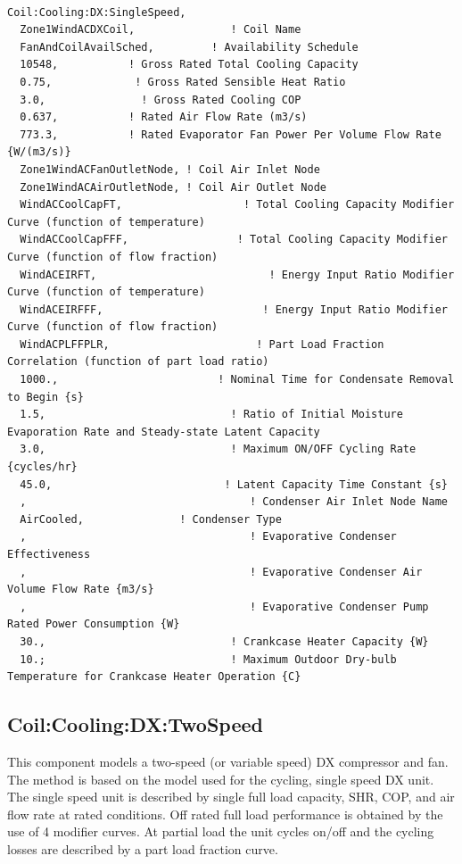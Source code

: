 \begin{lstlisting}

Coil:Cooling:DX:SingleSpeed,
  Zone1WindACDXCoil,               ! Coil Name
  FanAndCoilAvailSched,         ! Availability Schedule
  10548,           ! Gross Rated Total Cooling Capacity
  0.75,             ! Gross Rated Sensible Heat Ratio
  3.0,               ! Gross Rated Cooling COP
  0.637,           ! Rated Air Flow Rate (m3/s)
  773.3,           ! Rated Evaporator Fan Power Per Volume Flow Rate {W/(m3/s)}
  Zone1WindACFanOutletNode, ! Coil Air Inlet Node
  Zone1WindACAirOutletNode, ! Coil Air Outlet Node
  WindACCoolCapFT,                   ! Total Cooling Capacity Modifier Curve (function of temperature)
  WindACCoolCapFFF,                 ! Total Cooling Capacity Modifier Curve (function of flow fraction)
  WindACEIRFT,                           ! Energy Input Ratio Modifier Curve (function of temperature)
  WindACEIRFFF,                         ! Energy Input Ratio Modifier Curve (function of flow fraction)
  WindACPLFFPLR,                       ! Part Load Fraction Correlation (function of part load ratio)
  1000.,                         ! Nominal Time for Condensate Removal to Begin {s}
  1.5,                             ! Ratio of Initial Moisture Evaporation Rate and Steady-state Latent Capacity
  3.0,                             ! Maximum ON/OFF Cycling Rate {cycles/hr}
  45.0,                           ! Latent Capacity Time Constant {s}
  ,                                   ! Condenser Air Inlet Node Name
  AirCooled,               ! Condenser Type
  ,                                   ! Evaporative Condenser Effectiveness
  ,                                   ! Evaporative Condenser Air Volume Flow Rate {m3/s}
  ,                                   ! Evaporative Condenser Pump Rated Power Consumption {W}
  30.,                             ! Crankcase Heater Capacity {W}
  10.;                             ! Maximum Outdoor Dry-bulb Temperature for Crankcase Heater Operation {C}
\end{lstlisting}

\subsection{Coil:Cooling:DX:TwoSpeed}\label{coilcoolingdxtwospeed}

This component models a two-speed (or variable speed) DX compressor and fan. The method is based on the model used for the cycling, single speed DX unit. The single speed unit is described by single full load capacity, SHR, COP, and air flow rate at rated conditions. Off rated full load performance is obtained by the use of 4 modifier curves. At partial load the unit cycles on/off and the cycling losses are described by a part load fraction curve.

